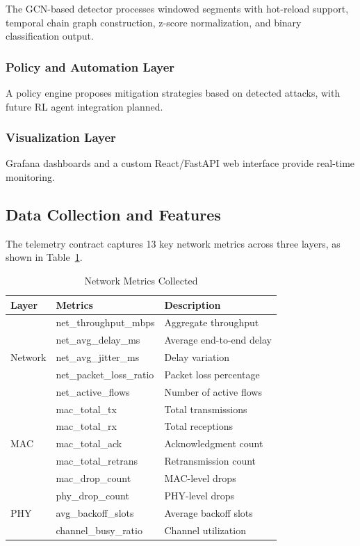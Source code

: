 \documentclass[12pt,a4paper]{article}
\begin{document}
The GCN-based detector processes windowed segments with hot-reload support, temporal chain graph construction, z-score normalization, and binary classification output.

\subsubsection{Policy and Automation Layer}

A policy engine proposes mitigation strategies based on detected attacks, with future RL agent integration planned.

\subsubsection{Visualization Layer}

Grafana dashboards and a custom React/FastAPI web interface provide real-time monitoring.

\subsection{Data Collection and Features}

The telemetry contract captures 13 key network metrics across three layers, as shown in Table~\ref{tab:metrics}.

\begin{table}[htbp]
\centering
\caption{Network Metrics Collected}
\label{tab:metrics}
\begin{tabular}{@{}lll@{}}
\toprule
\textbf{Layer} & \textbf{Metrics} & \textbf{Description} \\
\midrule
\multirow{5}{*}{Network} & net\_throughput\_mbps & Aggregate throughput \\
 & net\_avg\_delay\_ms & Average end-to-end delay \\
 & net\_avg\_jitter\_ms & Delay variation \\
 & net\_packet\_loss\_ratio & Packet loss percentage \\
 & net\_active\_flows & Number of active flows \\
\midrule
\multirow{5}{*}{MAC} & mac\_total\_tx & Total transmissions \\
 & mac\_total\_rx & Total receptions \\
 & mac\_total\_ack & Acknowledgment count \\
 & mac\_total\_retrans & Retransmission count \\
 & mac\_drop\_count & MAC-level drops \\
\midrule
\multirow{3}{*}{PHY} & phy\_drop\_count & PHY-level drops \\
 & avg\_backoff\_slots & Average backoff slots \\
 & channel\_busy\_ratio & Channel utilization \\
\bottomrule
\end{tabular}
\end{table}
\end{document}
